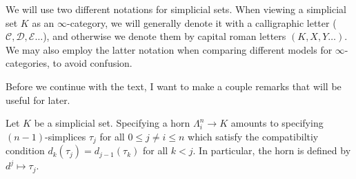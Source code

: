 \begin{notation}\label{1.1.2.11}
	We will use two different notations for simplicial sets. When viewing a simplicial set $K$ as an $\infty $-category, we will generally denote it with a calligraphic letter ($\mathcal{C} ,\mathcal{D} ,\mathcal{E} \ldots $), and otherwise we denote them by capital roman letters $(K,X,Y \ldots )$. We may also employ the latter notation when comparing different models for $\infty $-categories, to avoid confusion.
\end{notation}

Before we continue with the text, I want to make a couple remarks that will be useful for later.

\begin{proposition}\label{1.1.2.12}
	Let $K$ be a simplicial set. Specifying a horn $\Lambda_i^n\to K$ amounts to specifying $(n-1)$-simplices $\tau_j$ for all $0\leq j\neq i \leq n$ which satisfy the compatibiltiy condition $d_k(\tau_j)=d_{j-1} (\tau_k)$ for all $k<j$. In particular, the horn is defined by $d^j\mapsto\tau_j$.
\end{proposition}
